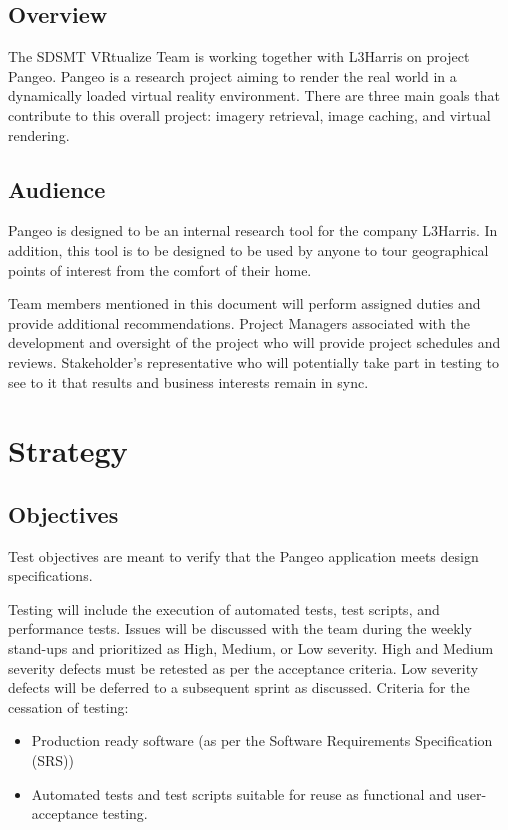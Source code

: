 \documentclass[letterpaper,10pt,english]{sphinxmanual}
\begin{document}
\section{Overview}
\label{\detokenize{test_plan/intro:overview}}
The SDSMT VRtualize Team is working together with L3Harris on project Pangeo. Pangeo is a research project aiming to render the real world in a dynamically loaded virtual reality environment. There are three main goals that contribute to this overall project: imagery retrieval, image caching, and virtual rendering.


\section{Audience}
\label{\detokenize{test_plan/intro:audience}}
Pangeo is designed to be an internal research tool for the company L3Harris. In addition, this tool  is to be designed to be used by anyone to tour geographical points of interest from the comfort of their home.

Team members mentioned in this document will perform assigned duties and provide additional recommendations. Project Managers associated with the development and oversight of the project who will provide project schedules and reviews. Stakeholder’s representative who will potentially take part in testing to see to it that results and business interests remain in sync.


\chapter{Strategy}
\label{\detokenize{test_plan/strategy:strategy}}\label{\detokenize{test_plan/strategy::doc}}

\section{Objectives}
\label{\detokenize{test_plan/strategy:objectives}}
Test objectives are meant to verify that the Pangeo application meets design specifications.

Testing will include the execution of automated tests, test scripts, and performance tests.  Issues will be discussed with the team during the weekly stand-ups and prioritized as High, Medium, or Low severity.  High and Medium severity defects must be retested as per the acceptance criteria.  Low severity defects will be deferred to a subsequent sprint as discussed.
Criteria for the cessation of testing:
\begin{itemize}
\item {} 
Production ready  software (as per the Software Requirements Specification (SRS))

\item {} 
Automated tests and test scripts suitable for reuse as functional and user-acceptance testing.

\end{itemize}
\end{document}
